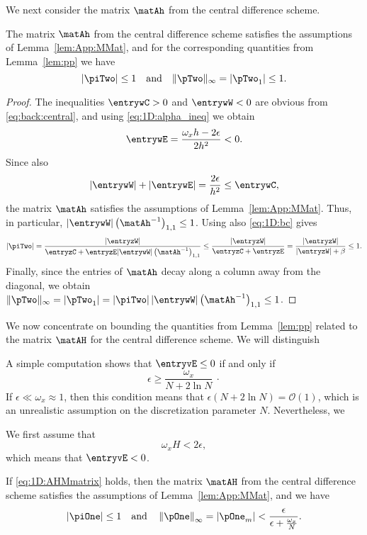 We next consider the matrix $\matAh$ from the central difference scheme.

\begin{lemma}\label{lem:1D:p2}
The matrix $\matAh$ from the central difference scheme satisfies the
assumptions of Lemma~\ref{lem:App:MMat}, and for the corresponding quantities from
Lemma~\ref{lem:pp} we have
%
$$\left|\piTwo\right|\leq 1 \quad\mbox{and}\quad
\|\pTwo\|_\infty=\left|\pTwo_{1}\right|\leq 1.$$
\end{lemma}

\begin{proof}
The inequalities $\entrywC>0$ and $\entrywW<0$ are obvious from
\eqref{eq:back:central}, and using \eqref{eq:1D:alpha_ineq} we obtain
%
$$\entrywE=\frac{\omega_x h-2\epsilon}{2h^{2}}<0.$$
%
Since also
%
$$|\entrywW|+|\entrywE|=\frac{2\epsilon}{h^{2}}\leq\entrywC,$$
%
the matrix $\matAh$ satisfies the assumptions of Lemma~\ref{lem:App:MMat}. Thus,
in particular, $|\entrywW| \left(\matAh ^{-1}\right)_{1,1}\leq 1$.
Using also \eqref{eq:1D:bc} gives
%
$$|\piTwo|=\frac{|\entryzW| }{\entryzC + \entryzE |\entrywW|
\left(\matAh ^{-1}\right)_{1,1}}\leq
\frac{|\entryzW| }{\entryzC + \entryzE}
= \frac{|\entryzW| }{|\entryzW|+\beta}\leq 1.$$
%
Finally, since the entries of $\matAh$ decay along a column away from the
diagonal, we obtain
%
$\|\pTwo\|_\infty=
\left|\pTwo_{1}\right|=|\piTwo|\,|\entrywW| \left(\matAh ^{-1}\right)_{1,1}
\leq 1$.
%
\end{proof}

We now concentrate on bounding the quantities from Lemma~\ref{lem:pp} related
to the matrix $\matAH$ for the central difference scheme. We will distinguish

A simple computation shows that $\entryvE\leq 0$ if and only if
%
$$\epsilon \geq \frac{\omega_x}{N+2\ln N} ~\cdot$$
%
If $\epsilon \ll \omega_x\approx 1$, then this condition means that
$\epsilon (N+2\ln N) = \mathscr{O}(1)$, which is an
unrealistic assumption on the discretization parameter $N$. Nevertheless, we

We first assume that
%
\begin{equation}
\omega_x H<2\epsilon,\label{eq:1D:AHMmatrix}
\end{equation}
%
which means that $\entryvE<0$.
%
\begin{lemma}\label{lem:1D:p3}
If \eqref{eq:1D:AHMmatrix} holds, then the matrix $\matAH$ from the central
difference scheme satisfies the assumptions of Lemma~\ref{lem:App:MMat}, and we have
%
\begin{equation*}%
\left|\piOne\right|\leq 1 \quad\mbox{and}\quad
\left\Vert\pOne\right\Vert_\infty=\left|\pOne_{m}\right|
<\frac{\epsilon}{\epsilon+\frac{\omega_x}{N}}.
\end{equation*}
\end{lemma}


